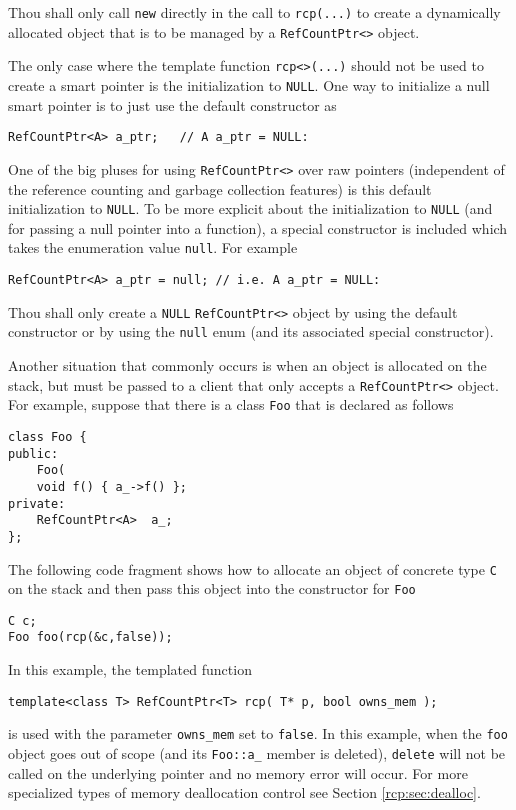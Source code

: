 \begin{commandment}\label{rcp:cmd:rcp-new}
Thou shall only call {}\texttt{new} directly
in the call to {}\texttt{rcp(...)} to create a dynamically allocated
object that is to be managed by a {}\texttt{RefCountPtr<>} object.
\end{commandment}

The only case where the template function {}\texttt{rcp<>(...)} should
not be used to create a smart pointer is the initialization to
{}\texttt{NULL}.  One way to initialize a null smart pointer is to just
use the default constructor as
%
{\scriptsize\begin{verbatim}
RefCountPtr<A> a_ptr;   // A a_ptr = NULL:
\end{verbatim}}
%
One of the big pluses for using {}\texttt{RefCountPtr<>} over raw
pointers (independent of the reference counting and garbage collection
features) is this default initialization to {}\texttt{NULL}.
To be more explicit about the initialization to {}\texttt{NULL} (and for
passing a null pointer into a function), a special constructor is
included which takes the enumeration value {}\texttt{null}.  For example
%
{\scriptsize\begin{verbatim}
RefCountPtr<A> a_ptr = null; // i.e. A a_ptr = NULL:
\end{verbatim}}
%

\begin{commandment}
Thou shall only create a {}\texttt{NULL}
{}\texttt{RefCountPtr<>} object by using the default constructor
or by using the {}\texttt{null} enum (and its associated special
constructor).
\end{commandment}

Another situation that commonly occurs is when an object is allocated
on the stack, but must be passed to a client that only accepts a
{}\texttt{RefCountPtr<>} object.  For example, suppose that there is a
class {}\texttt{Foo} that is declared as follows
%
{\scriptsize\begin{verbatim}
class Foo {
public:
    Foo(
    void f() { a_->f() };
private:
    RefCountPtr<A>  a_;
};
\end{verbatim}}
%
The following code fragment shows how to allocate an object of concrete
type {}\texttt{C} on the stack and then pass this object into the constructor
for {}\texttt{Foo}
%
{\scriptsize\begin{verbatim}
C c;
Foo foo(rcp(&c,false));
\end{verbatim}}
%
In this example, the templated function
%
{\scriptsize\begin{verbatim}
template<class T> RefCountPtr<T> rcp( T* p, bool owns_mem );
\end{verbatim}}
%
\noindent{}
is used with the parameter {}\texttt{owns\_mem} set to
{}\texttt{false}.  In this example, when the {}\texttt{foo} object
goes out of scope (and its {}\texttt{Foo::a\_} member is deleted),
{}\texttt{delete} will not be called on the underlying pointer and no
memory error will occur.  For more specialized types of memory
deallocation control see Section {}\ref{rcp:sec:dealloc}.

